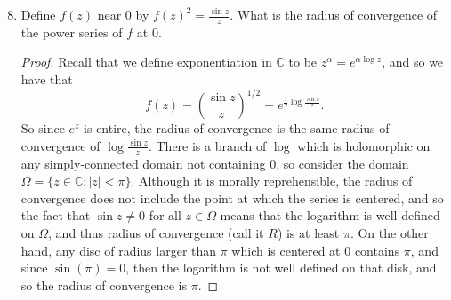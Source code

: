 \documentclass{article}
\begin{document}
\begin{enumerate}
	\setcounter{enumi}{7}
	
	\item Define $f(z)$ near $0$ by $f(z)^2 = \frac{\sin z}{z}$. What is the radius of convergence of the power series of $f$ at $0$.
	
	\begin{proof}
		Recall that we define exponentiation in $\mathbb{C}$ to be $z^\alpha = e^{\alpha \log z}$, and so we have that 
		\[f(z) = \left(  \frac{\sin z}{z} \right)^{1/2} =e^{\frac12\log \frac{\sin z}{z}}.\]
		So since $e^z$ is entire, the radius of convergence is the same radius of convergence of $\log \frac{\sin z}{z}$.
		There is a branch of $\log$ which is holomorphic on any simply-connected domain not containing $0$, 
		so consider the domain $\Omega = \{ z \in \mathbb{C} : |z| < \pi\}$. 
		Although it is morally reprehensible, the
		radius of convergence does not include the point at which the series is centered, and so the fact that
		$\sin{z} \neq 0$ for all $z \in \Omega$ means that the logarithm is well defined on $\Omega$, and thus
		radius of convergence (call it $R$) is at least $\pi$.
		On the other hand, any disc of radius larger than $\pi$ which is centered at $0$ contains $\pi$, and since
		$\sin(\pi) = 0$, then the logarithm is not well defined on that disk, and so
		the radius of convergence is $\pi$.
	\end{proof}
\end{enumerate}
\end{document}
